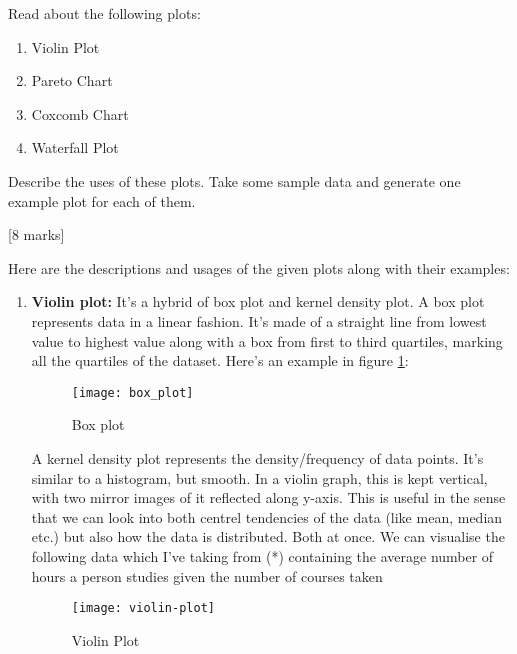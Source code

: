 \begin{que}
	Read about the following plots:
	\begin{enumerate}
		\item Violin Plot
		\item Pareto Chart
		\item Coxcomb Chart
		\item Waterfall Plot
	\end{enumerate}
	Describe the uses of these plots. Take some sample data and generate
	one example plot for each of them.

	\hspace*{\fill} [8 marks]
\end{que}

\begin{tcolorbox}[breakable]
	\begin{sol}
		Here are the descriptions and usages of the given plots along
		with their examples:
		\begin{enumerate}
			\item \textbf{Violin plot:} It's a hybrid of box plot
			      and kernel density plot. A box plot represents
			      data in a linear fashion. It's made of a straight
			      line from lowest value to highest value along
			      with a box from first to third quartiles, marking
			      all the quartiles of the dataset. Here's an
			      example in figure \ref{fig:box}:
			      \begin{figure}[H]
				      \centering
				      \texttt{[image: box\_plot]}
				      \caption{Box plot}
				      \label{fig:box}
			      \end{figure}
			      A kernel density plot represents the
			      density/frequency of data points. It's similar to
			      a histogram, but smooth. In a violin graph, this
			      is kept vertical, with two mirror images of it
			      reflected along y-axis. This is useful in the
			      sense that we can look into both centrel
			      tendencies of the data (like mean, median etc.)
			      but also how the data is distributed. Both at
			      once. We can visualise the following data which
			      I've taking from (*) containing the average
			      number of hours a person studies given the number
			      of courses taken
			      \begin{figure}[H]
				      \centering
				      \texttt{[image: violin-plot]}
				      \caption{Violin Plot}
				      \label{fig:violin}
			      \end{figure}

\end{enumerate}
\end{sol}
\end{tcolorbox}
